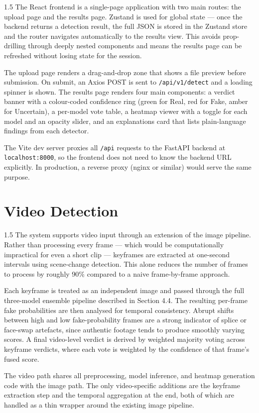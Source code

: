 \begin{spacing}{1.5}
The React frontend is a single-page application with two main routes: the upload page and the results page. Zustand is used for global state --- once the backend returns a detection result, the full JSON is stored in the Zustand store and the router navigates automatically to the results view. This avoids prop-drilling through deeply nested components and means the results page can be refreshed without losing state for the session.

The upload page renders a drag-and-drop zone that shows a file preview before submission. On submit, an Axios POST is sent to \texttt{/api/v1/detect} and a loading spinner is shown. The results page renders four main components: a verdict banner with a colour-coded confidence ring (green for Real, red for Fake, amber for Uncertain), a per-model vote table, a heatmap viewer with a toggle for each model and an opacity slider, and an explanations card that lists plain-language findings from each detector.

The Vite dev server proxies all \texttt{/api} requests to the FastAPI backend at \texttt{localhost:8000}, so the frontend does not need to know the backend URL explicitly. In production, a reverse proxy (nginx or similar) would serve the same purpose.
\end{spacing}

\section{Video Detection}

\begin{spacing}{1.5}
The system supports video input through an extension of the image pipeline. Rather than processing every frame --- which would be computationally impractical for even a short clip --- keyframes are extracted at one-second intervals using scene-change detection. This alone reduces the number of frames to process by roughly 90\% compared to a naive frame-by-frame approach.

Each keyframe is treated as an independent image and passed through the full three-model ensemble pipeline described in Section 4.4. The resulting per-frame fake probabilities are then analysed for temporal consistency. Abrupt shifts between high and low fake-probability frames are a strong indicator of splice or face-swap artefacts, since authentic footage tends to produce smoothly varying scores. A final video-level verdict is derived by weighted majority voting across keyframe verdicts, where each vote is weighted by the confidence of that frame's fused score.

The video path shares all preprocessing, model inference, and heatmap generation code with the image path. The only video-specific additions are the keyframe extraction step and the temporal aggregation at the end, both of which are handled as a thin wrapper around the existing image pipeline.
\end{spacing}

